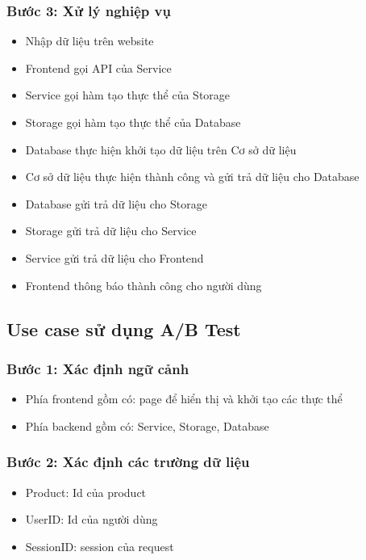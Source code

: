 \subsubsection{Bước 3: Xử lý nghiệp vụ}

\begin{itemize}
	\item Nhập dữ liệu trên website
	\item Frontend gọi API của Service
	\item Service gọi hàm tạo thực thể của Storage
	\item Storage gọi hàm tạo thực thể của Database
	\item Database thực hiện khởi tạo dữ liệu trên Cơ sở dữ liệu
	\item Cơ sở dữ liệu thực hiện thành công và gửi trả dữ liệu cho Database
	\item Database gửi trả dữ liệu cho Storage
	\item Storage gửi trả dữ liệu cho Service
	\item Service gửi trả dữ liệu cho Frontend
	\item Frontend thông báo thành công cho người dùng
\end{itemize}

\subsection{Use case sử dụng A/B Test}

\subsubsection{Bước 1: Xác định ngữ cảnh}

\begin{itemize}
	\item Phía frontend gồm có: page để hiển thị và khởi tạo các thực thể
	\item Phía backend gồm có: Service, Storage, Database
\end{itemize}

\subsubsection{Bước 2: Xác định các trường dữ liệu}

\begin{itemize}
	\item Product: Id của product
	\item UserID: Id của người dùng
	\item SessionID: session của request
\end{itemize}

